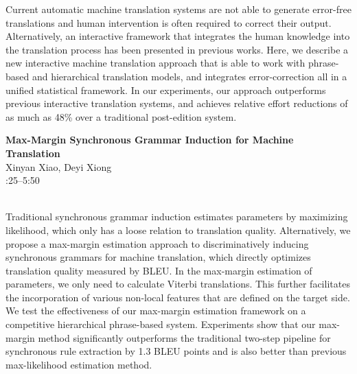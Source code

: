 \documentclass[twoside,makeidx]{book}
\renewcommand{\normalsize}{\fontsize{8}{9}\selectfont}
\renewcommand{\small}{\fontsize{7}{8}\selectfont}
\begin{document}
\nopagebreak%
\noindent%
{\small Current automatic machine translation systems are not able to generate error-free translations and human intervention is often required to correct their output. Alternatively, an interactive framework that integrates the human knowledge into the translation process has been presented in previous works. Here, we describe a new interactive machine translation approach that is able to work with phrase-based and hierarchical translation models, and integrates error-correction all in a unified statistical framework. In our experiments, our approach outperforms previous interactive translation systems, and achieves relative effort reductions of as much as 48\% over a traditional post-edition system.}
\par\vspace{2em}\noindent%
\begin{minipage}{\linewidth}%
\begin{center}
\textbf{\normalsize Max-Margin Synchronous Grammar Induction for Machine Translation}\\
\normalsize  Xinyan Xiao,  Deyi Xiong\\
{\small 5:25--5:50}\\
\end{center}
\end{minipage}\\[0.5em]
\nopagebreak%
\noindent%
{\small Traditional synchronous grammar induction estimates parameters by maximizing likelihood, which only has a loose relation to translation quality. Alternatively, we propose a max-margin estimation approach to discriminatively inducing synchronous grammars for machine translation, which directly optimizes translation quality measured by BLEU. In the max-margin estimation of parameters, we only need to calculate Viterbi translations. This further facilitates the incorporation of various non-local features that are defined on the target side. We test the effectiveness of our max-margin estimation framework on a competitive hierarchical phrase-based system. Experiments show that our max-margin method significantly outperforms the traditional two-step pipeline for synchronous rule extraction by 1.3 BLEU points and is also better than previous max-likelihood estimation method.}
\clearpage
\end{document}
